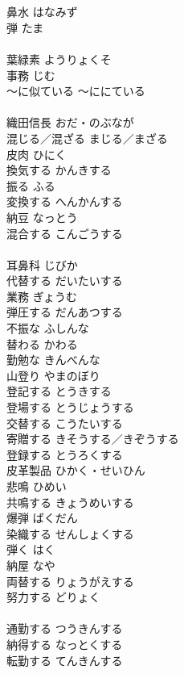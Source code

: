 \documentclass[8pt]{extreport}
\begin{document}
\begin{CJK}{UTF8}{min}
\\	[和語]
\\	鼻水	はなみず	
\\	弾	たま	
\\	[和語]
\\	葉緑素	ようりょくそ	
\\	事務	じむ	
\\	～に似ている	～ににている	
\\	[和語]
\\	織田信長	おだ・のぶなが	
\\	混じる／混ざる	まじる／まざる	
\\	皮肉	ひにく	
\\	換気する	かんきする	
\\	振る	ふる	
\\	変換する	へんかんする	
\\	納豆	なっとう	
\\	混合する	こんごうする	
\\	[漢語]
\\	耳鼻科	じびか	
\\	代替する	だいたいする	
\\	業務	ぎょうむ	
\\	弾圧する	だんあつする	
\\	不振な	ふしんな	
\\	替わる	かわる	
\\	勤勉な	きんべんな	
\\	山登り	やまのぼり	
\\	登記する	とうきする	
\\	登場する	とうじょうする	
\\	交替する	こうたいする	
\\	寄贈する	きそうする／きぞうする	
\\	登録する	とうろくする	
\\	皮革製品	ひかく・せいひん	
\\	悲鳴	ひめい	
\\	共鳴する	きょうめいする	
\\	爆弾	ばくだん	
\\	染織する	せんしょくする	
\\	弾く	はく	
\\	納屋	なや	
\\	両替する	りょうがえする	
\\	努力する	どりょく	
\\	[漢語]
\\	通勤する	つうきんする	
\\	納得する	なっとくする	
\\	転勤する	てんきんする	

\end{CJK}
\end{document}
